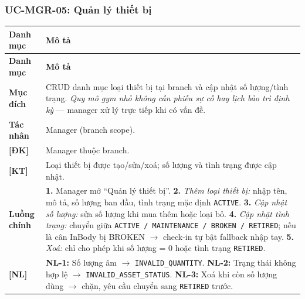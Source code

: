 \subsubsection{UC-MGR-05: Quản lý thiết bị}
\begingroup
\renewcommand{\arraystretch}{1.3}
\begin{longtable}{|>{\centering\arraybackslash}m{3cm}|>{\raggedright\arraybackslash}m{12cm}|}
\hline
\textbf{Danh mục} & \textbf{Mô tả} \\ \hline
\endfirsthead
\hline
\textbf{Danh mục} & \textbf{Mô tả} \\ \hline
\endhead
\hline
\endfoot
\textbf{Mục đích} & CRUD danh mục loại thiết bị tại branch và cập nhật số lượng/tình trạng. \emph{Quy mô gym nhỏ không cần phiếu sự cố hay lịch bảo trì định kỳ} — manager xử lý trực tiếp khi có vấn đề. \\
\hline
\textbf{Tác nhân} & Manager (branch scope). \\
\hline
\textbf{[ĐK]} & Manager thuộc branch. \\
\hline
\textbf{[KT]} & Loại thiết bị được tạo/sửa/xoá; số lượng và tình trạng được cập nhật. \\
\hline
\textbf{Luồng chính} & \textbf{1.} Manager mở ``Quản lý thiết bị''. \textbf{2.} \emph{Thêm loại thiết bị:} nhập tên, mô tả, số lượng ban đầu, tình trạng mặc định \texttt{ACTIVE}. \textbf{3.} \emph{Cập nhật số lượng:} sửa số lượng khi mua thêm hoặc loại bỏ. \textbf{4.} \emph{Cập nhật tình trạng:} chuyển giữa \texttt{ACTIVE / MAINTENANCE / BROKEN / RETIRED}; nếu là cân InBody bị BROKEN $\rightarrow$ check-in tự bật fallback nhập tay. \textbf{5.} \emph{Xoá:} chỉ cho phép khi số lượng = 0 hoặc tình trạng \texttt{RETIRED}. \\
\hline
\textbf{[NL]} & \textbf{NL-1:} Số lượng âm $\rightarrow$ \texttt{INVALID\_QUANTITY}. \textbf{NL-2:} Trạng thái không hợp lệ $\rightarrow$ \texttt{INVALID\_ASSET\_STATUS}. \textbf{NL-3:} Xoá khi còn số lượng dùng $\rightarrow$ chặn, yêu cầu chuyển sang \texttt{RETIRED} trước. \\
\hline
\end{longtable}
\endgroup

